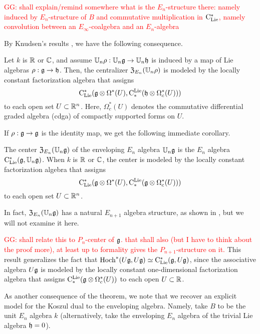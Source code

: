 \documentclass[11pt]{amsart}
\numberwithin{equation}{section}
\def\greg{\textcolor{red}{GG: }\textcolor{red}}
\begin{document}
\greg{shall explain/remind somewhere what is the $E_n$-structure there: namely induced by $E_n$-structure of $B$ and commutative multiplication in ${\rm C}_{\rm Lie}^*$, namely convolution between an $E_\infty$-coalgebra and an $E_n$-algebra}

By Knudsen's results \cite{Knudsen}, we have the following consequence.

\begin{cor}
Let $k$ is $\mathbb R$ or $\mathbb C$, and assume $\mathbb U_n \rho:  \mathbb U_n \mathfrak g \to \mathbb U_n \mathfrak h$ is induced by a map of Lie algebras $\rho: \mathfrak g \to \mathfrak h$.  Then, the centralizer ${\frak Z}_{E_n}(\mathbb U_n \rho)$ is modeled by the locally constant factorization algebra that assigns
\[
{\rm C}_{\rm Lie}^*(\mathfrak g \otimes \Omega^*(U), {\rm C}^{\rm Lie}_*( \mathfrak h \otimes \Omega^*_c(U)))
\]
to each open set $U \subset \mathbb R^n$. Here, $\Omega^*_c(U)$ denotes the commutative differential graded algebra (cdga) of compactly supported forms on $U$.
\end{cor}

If $\rho: \mathfrak g \to \mathfrak g$ is the identity map, we get the following immediate corollary.

\begin{cor}
\label{thm: center}
The center ${\frak Z}_{E_n}(\mathbb U_n\mathfrak g)$ of the enveloping $E_n$ algebra $\mathbb U_n\mathfrak g$ is the $E_n$ algebra ${\rm C}_{\rm Lie}^*(\mathfrak g, \mathbb U_n\mathfrak g)$. 
When $k$ is $\mathbb R$ or $\mathbb C$, the 
center is modeled by the locally constant factorization algebra that assigns
\[
{\rm C}_{\rm Lie}^*(\mathfrak g \otimes \Omega^*(U), {\rm C}^{\rm Lie}_*( \mathfrak g \otimes \Omega^*_c(U)))
\]
to each open set $U \subset \mathbb R^n$.
\end{cor}

In fact, ${\frak Z}_{E_n}(\mathbb U_n\mathfrak g)$ has a natural $E_{n+1}$ algebra structure, 
as shown in \cite{LurieHA, GTZ}, 
but we will not examine it here.

\greg{shall relate this to $P_n$-center of $\mathfrak g$. that shall also (but I have to think about the proof more), at least up to formality gives the $P_{n+1}$-structure on it. }
This result generalizes the fact that ${\rm Hoch}^*(U\mathfrak g,U\mathfrak g) \simeq {\rm C}_{\rm Lie}^*(\mathfrak g, U\mathfrak g)$, since the associative algebra $U\mathfrak g$ is modeled by the locally constant one-dimensional factorization algebra that assigns ${\rm C}^{\rm Lie}_* (\mathfrak g \otimes \Omega^*_c(U))$ to each open $U \subset \mathbb R$. 

As another consequence of the theorem, we note that we recover an explicit model for the Koszul dual to the enveloping algebra. 
Namely, take $B$ to be the unit $E_n$ algebra $k$ (alternatively, take the enveloping $E_n$ algebra of the trivial Lie algebra $\mathfrak h = 0$).
\end{document}
